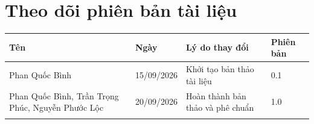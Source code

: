 {
    \titleformat{\section}{\Large\bfseries\raggedright}{}{0pt}{}
    \section*{Theo dõi phiên bản tài liệu}
}

\noindent
\begin{tabularx}{\textwidth}{|L{4cm}|p{2.3cm}|X|p{2.5cm}|}
    \hline
    \textbf{Tên} & \textbf{Ngày} & \textbf{Lý do thay đổi} & \textbf{Phiên bản} \\ \hline
    Phan Quốc Bình & 15/09/2026 & Khởi tạo bản thảo tài liệu & 0.1 \\ \hline
    Phan Quốc Bình, Trần Trọng Phúc, Nguyễn Phước Lộc & 20/09/2026 & Hoàn thành bản thảo và phê chuẩn & 1.0 \\ \hline
    & & & \\ \hline
\end{tabularx}